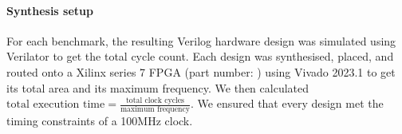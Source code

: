 \paragraph{Synthesis setup} For each benchmark, the resulting Verilog hardware
design was simulated using Verilator to get the total cycle count.  Each design
was synthesised, placed, and routed onto a Xilinx series 7 FPGA (part number:
) using Vivado 2023.1 to get its total area and its
maximum frequency.  We then calculated
$\text{total execution time} = \frac{\text{total clock cycles}}{\text{maximum
    frequency}}$.  We ensured that every design met the timing constraints of a
100MHz clock.



\newcommand\BambuDefault{%
\setul{-1pt}{3pt}\setulcolor{colorBambuDefaultLIGHT}%
{\ul{\textsf{Bambu-default}}}}

\newcommand\BambuNoOpt{%
\setul{-1pt}{3pt}\setulcolor{colorBambuNoOptLIGHT}%
{\ul{\textsf{Bambu-no-opt}}}}

\newcommand\VericertBase{%
\setul{-1pt}{3pt}\setulcolor{colorVericertBaseLIGHT}%
{\ul{\textsf{Vericert-original}}}}

\newcommand\VericertList{%
\setul{-1pt}{3pt}\setulcolor{colorVericertListLIGHT}%
{\ul{\textsf{Vericert-list-scheduling}}}}

\newcommand\VericertHyper{%
\setul{-1pt}{3pt}\setulcolor{colorVericertHyperLIGHT}%
{\ul{\textsf{Vericert-hyperblock-scheduling}}}}


